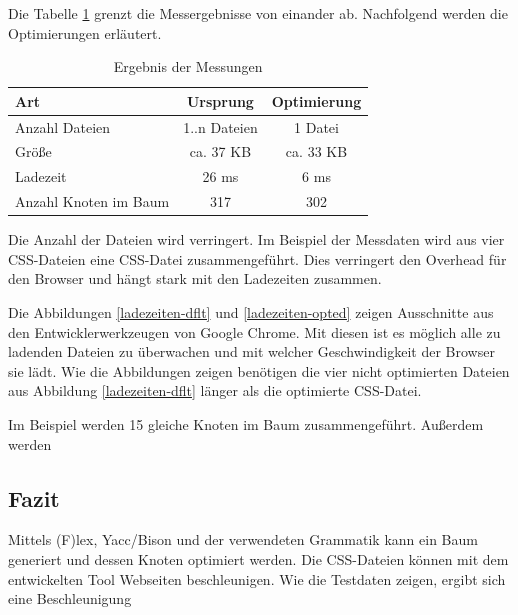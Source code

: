 Die Tabelle \ref{messungen-ergebnis} grenzt die Messergebnisse von einander ab. Nachfolgend werden die Optimierungen erläutert.

\begin{table}[ht!]
	\centering
	\begin{tabular}{l | c | c}
		Art & Ursprung & Optimierung \\
		\hline
		Anzahl Dateien & 1..n Dateien & 1 Datei \\
		Größe & ca. 37 KB & ca. 33 KB \\
		Ladezeit & 26 ms & 6 ms\\
		Anzahl Knoten im Baum & 317 & 302 \\
	\end{tabular}
	\caption{Ergebnis der Messungen}
	\label{messungen-ergebnis}
\end{table}

Die Anzahl der Dateien wird verringert. Im Beispiel der Messdaten wird aus vier CSS-Dateien eine CSS-Datei zusammengeführt. Dies verringert den Overhead für den Browser und hängt stark mit den Ladezeiten zusammen. 

Die Abbildungen \ref{ladezeiten-dflt} und \ref{ladezeiten-opted} zeigen Ausschnitte aus den Entwicklerwerkzeugen von Google Chrome. Mit diesen ist es möglich alle zu ladenden Dateien zu überwachen und mit welcher Geschwindigkeit der Browser sie lädt. Wie die Abbildungen zeigen benötigen die vier nicht optimierten Dateien aus Abbildung \ref{ladezeiten-dflt} länger als die optimierte CSS-Datei. 

Im Beispiel werden 15 gleiche Knoten im Baum zusammengeführt. Außerdem werden 
\subsection{Fazit}
Mittels (F)lex, Yacc/Bison und der verwendeten Grammatik kann ein Baum generiert und dessen Knoten optimiert werden. Die CSS-Dateien können mit dem entwickelten Tool Webseiten beschleunigen. Wie die Testdaten zeigen, ergibt sich eine Beschleunigung 